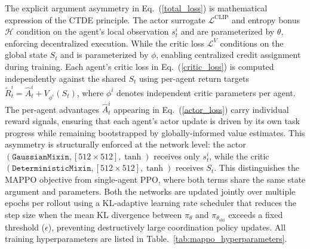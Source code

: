 \documentclass[a4paper,fleqn]{cas-dc}
\begin{document}
The explicit argument asymmetry in Eq.~(\ref{total_loss}) is mathematical expression of the CTDE principle. The actor surrogate $\mathcal{L}^{\text{CLIP}}$ and entropy bonus $\mathcal{H}$ condition on the agent's local observation $s_t^i$ and are parameterized by $\theta$, enforcing decentralized execution. While the critic loss $\mathcal{L}^{V}$ conditions on the global state $S_t$ and is parameterized by $\phi$, enabling centralized credit assignment during training. Each agent's critic loss in Eq.~(\ref{critic_loss}) is computed independently against the shared $S_t$ using per-agent return targets $\tilde{R}_t^i = \hat{A}_t^i + V_{\phi^i}(S_t)$, where $\phi^i$ denotes independent critic parameters per agent. The per-agent advantages $\hat{A}_t^i$ appearing in Eq.~(\ref{actor_loss}) carry individual reward signals, ensuring that each agent's actor update is driven by its own task progress while remaining bootstrapped by globally-informed value estimates. This asymmetry is structurally enforced at the network level: the actor $(\texttt{GaussianMixin}, [512 \times 512], \tanh)$ receives only $s_t^i$, while the critic $(\texttt{DeterministicMixin}, [512 \times 512], \tanh)$ receives $S_t$. This distinguishes the MAPPO objective from single-agent PPO, where both terms share the same state argument and parameters. Both the networks are updated jointly over multiple epochs per rollout using a KL-adaptive learning rate scheduler that reduces the step size when the mean KL divergence between $\pi_{\theta}$ and $\pi_{\theta_{\text{old}}}$ exceeds a fixed threshold ($\epsilon$), preventing destructively large coordination policy updates. All training hyperparameters are listed in Table.~\ref{tab:mappo_hyperparameters}.
\end{document}
